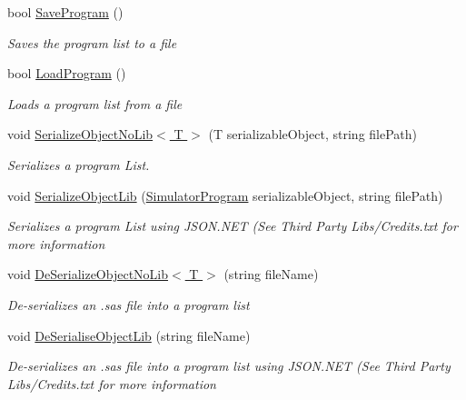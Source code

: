 \begin{DoxyCompactItemize}
bool \hyperlink{class_c_p_u___o_s___simulator_1_1_main_window_a843bbe93c5c2225820d216cc1cb7d4e9}{Save\+Program} ()
\begin{DoxyCompactList}\small\item\em Saves the program list to a file \end{DoxyCompactList}\item 
bool \hyperlink{class_c_p_u___o_s___simulator_1_1_main_window_ad788d74c9d6582f3302912cbbba410b0}{Load\+Program} ()
\begin{DoxyCompactList}\small\item\em Loads a program list from a file \end{DoxyCompactList}\item 
void \hyperlink{class_c_p_u___o_s___simulator_1_1_main_window_a9f2c416d5f710e3244815afcfae636c0}{Serialize\+Object\+No\+Lib$<$ T $>$} (T serializable\+Object, string file\+Path)
\begin{DoxyCompactList}\small\item\em Serializes a program List. \end{DoxyCompactList}\item 
void \hyperlink{class_c_p_u___o_s___simulator_1_1_main_window_a881ff0b4d97eb894094d6eb954d28824}{Serialize\+Object\+Lib} (\hyperlink{class_c_p_u___o_s___simulator_1_1_c_p_u_1_1_simulator_program}{Simulator\+Program} serializable\+Object, string file\+Path)
\begin{DoxyCompactList}\small\item\em Serializes a program List using J\+S\+O\+N.\+N\+E\+T (See Third Party Libs/\+Credits.\+txt for more information \end{DoxyCompactList}\item 
void \hyperlink{class_c_p_u___o_s___simulator_1_1_main_window_ac8a0c8581f950fa846e14180c60a71aa}{De\+Serialize\+Object\+No\+Lib$<$ T $>$} (string file\+Name)
\begin{DoxyCompactList}\small\item\em De-\/serializes an .sas file into a program list \end{DoxyCompactList}\item 
void \hyperlink{class_c_p_u___o_s___simulator_1_1_main_window_a53a763139f01142850f59be150ccc122}{De\+Serialise\+Object\+Lib} (string file\+Name)
\begin{DoxyCompactList}\small\item\em De-\/serializes an .sas file into a program list using J\+S\+O\+N.\+N\+E\+T (See Third Party Libs/\+Credits.\+txt for more information \end{DoxyCompactList}\item 

\end{DoxyCompactItemize}
